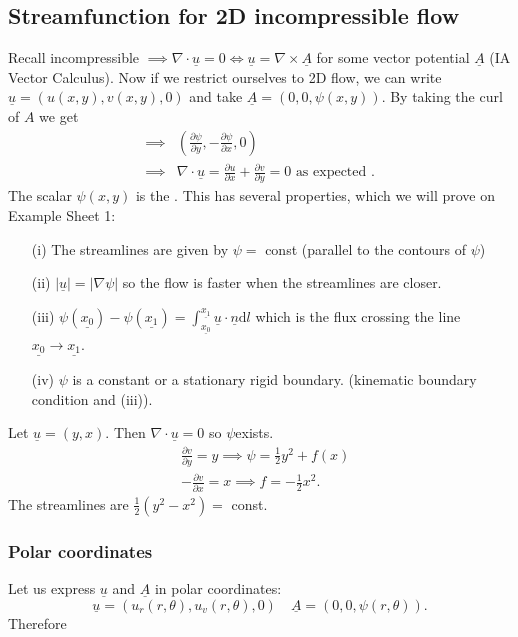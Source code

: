 \documentclass[a4paper]{scrartcl}
\renewcommand{\vec}[1]{\underline{#1}}
\begin{document}
\subsection{Streamfunction for 2D incompressible flow}
Recall incompressible $\implies \nabla \cdot \vec{u}=0 \iff \vec{u}=\nabla \times \vec{A}$ for some vector potential $\vec{A}$ (IA Vector Calculus). Now if we restrict ourselves to 2D flow, we can write $\vec{u}=(u (x,y), v (x,y),0)$ and take $\vec{A}=(0,0,\psi (x,y))$. By taking the curl of $A$ we get
\begin{align*}
    \implies & \left(\frac{\partial \psi}{\partial y}, -\frac{\partial \psi}{\partial x},0\right)\\
    \implies & \nabla \cdot \vec{u}=\frac{\partial u}{\partial x}+\frac{\partial v}{\partial y}=0 \text{ as expected } .
\end{align*}
The scalar $\psi (x,y)$ is the . This has several properties, which we will prove on Example Sheet 1: 
\begin{itemize}
    \item[(i)] The streamlines are given by $\psi=$ const (parallel to the contours of $\psi$)
    \item[(ii)] $|\vec{u}|=|\nabla \psi|$ so the flow is faster when the streamlines are closer. 
    \item[(iii)] $\psi (\vec{x_0})-\psi (\vec{x_1})=\int_{\vec{x_0}}^{\vec{x_1}}\vec{u} \cdot \vec{n} \mathrm{d}l $ which is the flux crossing the line $\vec{x_0} \rightarrow \vec{x_1}$.
    \item[(iv)] $\psi$ is a constant or a stationary rigid boundary. (kinematic boundary condition and (iii)).  
\end{itemize}
\begin{example}
     Let $\vec{u}=(y,x)$. Then $\nabla \cdot \vec{u}=0$ so $\psi$exists. 
     \begin{align*}
        &\frac{\partial v}{\partial y}=y \implies \psi=\frac{1}{2} y^{2}+f (x)\\
        &-\frac{\partial v}{\partial x}=x  \implies f=-\frac{1}{2}x^2.
     \end{align*}
     The streamlines are $\frac{1}{2}( y^2-x^2)=$ const. 
\end{example}
\subsubsection{Polar coordinates}
Let us express $\vec{u}$ and $\vec{A}$ in polar coordinates: \[
\vec{u}=(u_{r}(r,\theta), u_{v}(r, \theta),0) \quad \vec{A}=(0,0,\psi (r,\theta))
.\] 
Therefore 
\end{document}
